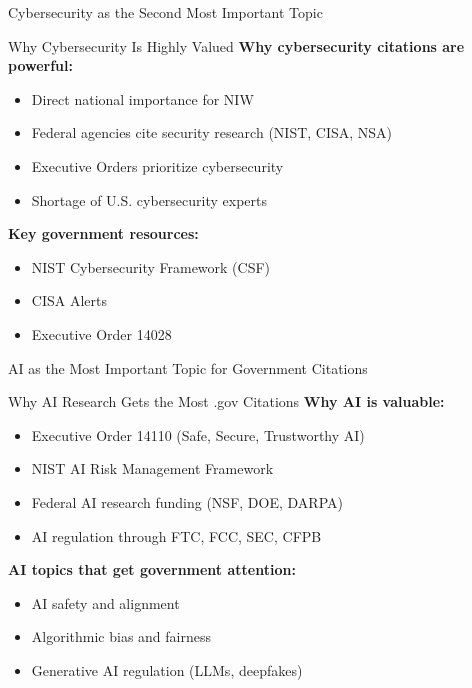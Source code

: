 \documentclass[11pt]{beamer}
\begin{document}
	\begin{frame}{Cybersecurity as the Second Most Important Topic}
		\small
		\begin{block}{Why Cybersecurity Is Highly Valued}
			\textbf{Why cybersecurity citations are powerful:}
			\begin{itemize}
				\item Direct national importance for NIW
				\item Federal agencies cite security research (NIST, CISA, NSA)
				\item Executive Orders prioritize cybersecurity
				\item Shortage of U.S. cybersecurity experts
			\end{itemize}
			\textbf{Key government resources:}
			\begin{itemize}
				\item NIST Cybersecurity Framework (CSF)
				\item CISA Alerts
				\item Executive Order 14028
			\end{itemize}
		\end{block}
	\end{frame}
	
	\begin{frame}{AI as the Most Important Topic for Government Citations}
		\small
		\begin{block}{Why AI Research Gets the Most .gov Citations}
			\textbf{Why AI is valuable:}
			\begin{itemize}
				\item Executive Order 14110 (Safe, Secure, Trustworthy AI)
				\item NIST AI Risk Management Framework
				\item Federal AI research funding (NSF, DOE, DARPA)
				\item AI regulation through FTC, FCC, SEC, CFPB
			\end{itemize}
			\textbf{AI topics that get government attention:}
			\begin{itemize}
				\item AI safety and alignment
				\item Algorithmic bias and fairness
				\item Generative AI regulation (LLMs, deepfakes)
			\end{itemize}
		\end{block}
	\end{frame}
	
	
	
\end{document}
